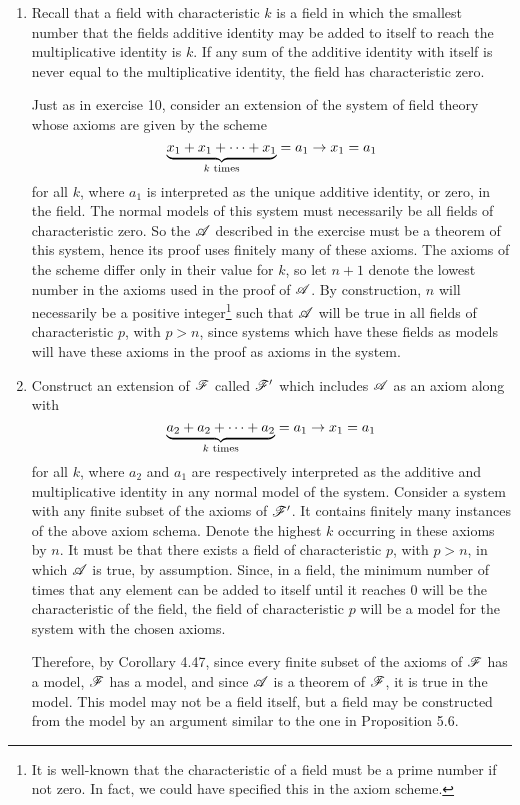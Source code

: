 \begin{enumerate}
  \item %
    Recall that a field with characteristic \(k\) is a field in which the smallest number that the fields additive identity may be added to itself to reach the multiplicative identity is \(k\). If any sum of the additive identity with itself is never equal to the multiplicative identity, the field has characteristic zero.

    Just as in exercise 10, consider an extension of the system of field theory whose axioms are given by the scheme
    \[\underbrace{x_1 + x_1 + \dots + x_1}_{k \text{ times}} = a_1 \rightarrow x_1 = a_1\]
    for all \(k\), where \(a_1\) is interpreted as the unique additive identity, or zero, in the field. The normal models of this system must necessarily be all fields of characteristic zero. So the \wf{} \(\mathscr{A}\) described in the exercise must be a theorem of this system, hence its proof uses finitely many of these axioms. The axioms of the scheme differ only in their value for \(k\), so let \(n + 1\) denote the lowest number in the axioms used in the proof of \(\mathscr{A}\). By construction, \(n\) will necessarily be a positive integer\footnote{It is well-known that the characteristic of a field must be a prime number if not zero. In fact, we could have specified this in the axiom scheme.} such that \(\mathscr{A}\) will be true in all fields of characteristic \(p\), with \(p > n\), since systems which have these fields as models will have these axioms in the proof as axioms in the system.

  \item %
    Construct an extension of \(\mathscr{F}\) called \(\mathscr{F}'\) which includes \(\mathscr{A}\) as an axiom along with
    \[\underbrace{a_2 + a_2 + \dots + a_2}_{k \text{ times}} = a_1 \rightarrow x_1 = a_1\]
    for all \(k\), where \(a_2\) and \(a_1\) are respectively interpreted as the additive and multiplicative identity in any normal model of the system. Consider a system with any finite subset of the axioms of \(\mathscr{F}'\). It contains finitely many instances of the above axiom schema. Denote the highest \(k\) occurring in these axioms by \(n\). It must be that there exists a field of characteristic \(p\), with \(p>n\), in which \(\mathscr{A}\) is true, by assumption. Since, in a field, the minimum number of times that any element can be added to itself until it reaches \(0\) will be the characteristic of the field, the field of characteristic \(p\) will be a model for the system with the chosen axioms. 

    Therefore, by Corollary 4.47, since every finite subset of the axioms of \(\mathscr{F}\) has a model, \(\mathscr{F}\) has a model, and since \(\mathscr{A}\) is a theorem of \(\mathscr{F}\), it is true in the model. This model may not be a field itself, but a field may be constructed from the model by an argument similar to the one in Proposition 5.6.
\end{enumerate}
